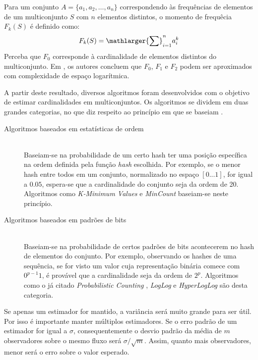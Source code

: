 Para um conjunto $A = \{a_1, a_2, \dots, a_n\}$ correspondendo às frequências de elementos de um multiconjunto $S$ com $n$ elementos distintos, o momento de frequêcia $F_k(S)$ é definido como:
\[
F_k(S) = \mathlarger{\sum}_{i=1}^n a_i^k
\]
Perceba que $F_0$ corresponde à cardinalidade de elementos distintos do multiconjunto. Em \cite{alon1996space}, os autores concluem que $F_0$, $F_1$ e $F_2$ podem ser aproximados com complexidade de espaço logarítmica. 

A partir deste resultado, diversos algoritmos foram desenvolvidos com o objetivo de estimar cardinalidades em multiconjuntos. Os algoritmos se dividem em duas grandes categorias, no que diz respeito ao princípio em que se baseiam \cite{flajolet2008hyperloglog,clifford2012statistical}.

\begin{description}
  \item[Algoritmos baseados em estatísticas de ordem] \hfill \\
    Baseiam-se na probabilidade de um certo hash ter uma posição específica na ordem definida pela função \emph{hash} escolhida. Por exemplo, se o menor hash entre todos em um conjunto, normalizado no espaço $[0...1]$, for igual a $0.05$, espera-se que a cardinalidade do conjunto seja da ordem de 20. Algoritmos como \emph{K-Minimum Values} \cite{bar2002counting} e \emph{MinCount} \cite{giroire2009order} baseiam-se neste princípio.
  
  \item[Algoritmos baseados em padrões de bits] \hfill \\
    Baseiam-se na probabilidade de certos padrões de bits acontecerem no hash de elementos do conjunto. Por exemplo, observando os hashes de uma sequência, se for visto um valor cuja representação binária comece com $0^{p-1}1$, é provável que a cardinalidade seja da ordem de $2^p$. Algoritmos como o já citado \emph{Probabilistic Counting}  \cite{flajolet1985probabilistic}, \emph{LogLog} \cite{durand2003loglog} e \emph{HyperLogLog} \cite{flajolet2008hyperloglog} são desta categoria.
\end{description}

Se apenas um estimador for mantido, a variância será muito grande para ser útil. Por isso é importante manter múltiplos estimadores. Se o erro padrão de um estimador for igual a $\sigma$, consequentemente o desvio padrão da média de $m$ observadores sobre o mesmo fluxo será $\sigma/\sqrt{m}$. Assim, quanto mais observadores, menor será o erro sobre o valor esperado.

